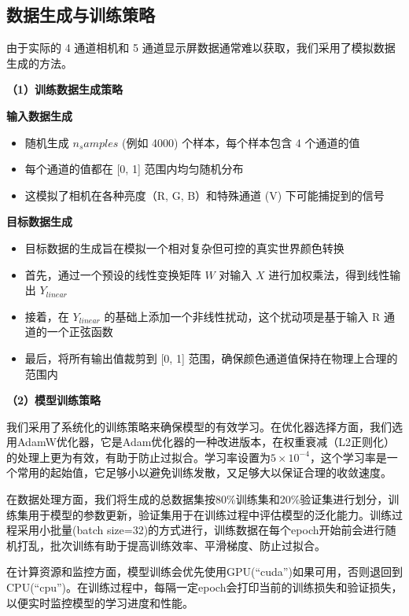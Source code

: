 \subsection[\hspace{-2pt}数据生成与训练策略]{{\heiti{} \hspace{-8pt}数据生成与训练策略}}\label{section2: 数据生成与训练策略}

由于实际的 4 通道相机和 5 通道显示屏数据通常难以获取，我们采用了模拟数据生成的方法。

\noindent\textbf{（1）训练数据生成策略}

 \textbf{输入数据生成}
\begin{itemize}
    \item 随机生成 $n_samples$ (例如 4000) 个样本，每个样本包含 4 个通道的值
    \item 每个通道的值都在 [0, 1] 范围内均匀随机分布
    \item 这模拟了相机在各种亮度（R, G, B）和特殊通道 (V) 下可能捕捉到的信号
\end{itemize}

 \textbf{目标数据生成}
\begin{itemize}
    \item 目标数据的生成旨在模拟一个相对复杂但可控的真实世界颜色转换
    \item 首先，通过一个预设的线性变换矩阵 $W$ 对输入 $X$ 进行加权乘法，得到线性输出 $Y_{linear}$
    \item 接着，在 $Y_{linear}$ 的基础上添加一个非线性扰动，这个扰动项是基于输入 R 通道的一个正弦函数
    \item 最后，将所有输出值裁剪到 [0, 1] 范围，确保颜色通道值保持在物理上合理的范围内
\end{itemize}

\noindent\textbf{（2）模型训练策略}

我们采用了系统化的训练策略来确保模型的有效学习。在优化器选择方面，我们选用AdamW优化器，它是Adam优化器的一种改进版本，在权重衰减（L2正则化）的处理上更为有效，有助于防止过拟合。学习率设置为$5 \times 10^{-4}$，这个学习率是一个常用的起始值，它足够小以避免训练发散，又足够大以保证合理的收敛速度。

在数据处理方面，我们将生成的总数据集按80\%训练集和20\%验证集进行划分，训练集用于模型的参数更新，验证集用于在训练过程中评估模型的泛化能力。训练过程采用小批量(batch size=32)的方式进行，训练数据在每个epoch开始前会进行随机打乱，批次训练有助于提高训练效率、平滑梯度、防止过拟合。

在计算资源和监控方面，模型训练会优先使用GPU(“cuda”)如果可用，否则退回到CPU(“cpu”)。在训练过程中，每隔一定epoch会打印当前的训练损失和验证损失，以便实时监控模型的学习进度和性能。

